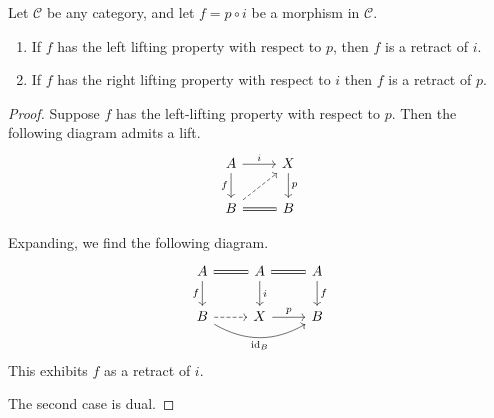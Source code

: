 \documentclass[main.tex]{subfiles}
\begin{document}
\begin{lemma}
  \label{lemma:retract_argument}
  Let $\mathcal{C}$ be any category, and let $f = p \circ i$ be a morphism in $\mathcal{C}$.
  \begin{enumerate}
    \item If $f$ has the left lifting property with respect to $p$, then $f$ is a retract of $i$.

    \item If $f$ has the right lifting property with respect to $i$ then $f$ is a retract of $p$.
  \end{enumerate}
\end{lemma}
\begin{proof}
  Suppose $f$ has the left-lifting property with respect to $p$. Then the following diagram admits a lift.
  \begin{equation*}
    \begin{tikzcd}
      A
      \arrow[r, "i"]
      \arrow[d, swap, "f"]
      & X
      \arrow[d, "p"]
      \\
      B
      \arrow[r, equals]
      \arrow[ur, dashed]
      & B
    \end{tikzcd}
  \end{equation*}

  Expanding, we find the following diagram.
  \begin{equation*}
    \begin{tikzcd}
      A
      \arrow[r, equals]
      \arrow[d, swap, "f"]
      & A
      \arrow[d, "i"]
      \arrow[r, equals]
      & A
      \arrow[d, "f"]
      \\
      B
      \arrow[r, dashed]
      \arrow[rr, bend right, swap, "\id_{B}"]
      & X
      \arrow[r, "p"]
      & B
    \end{tikzcd}
  \end{equation*}
  This exhibits $f$ as a retract of $i$.

  The second case is dual.
\end{proof}
\end{document}

